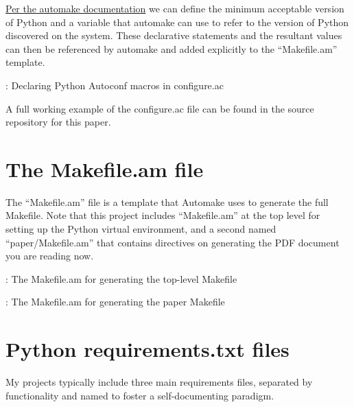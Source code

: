 \justifying
\href{https://www.gnu.org/software/automake/manual/html\_node/Python.html}{Per the automake documentation} we can define the minimum acceptable version of Python
and a variable that automake can use to refer to the version of Python discovered on the system. These declarative statements and the resultant values can then be
referenced by automake and added explicitly to the ``Makefile.am'' template.

\begin{mybox}{\thetcbcounter: Declaring Python Autoconf macros in configure.ac}
    
\end{mybox}
\vspace{2mm}

\justifying
A full working example of the configure.ac file can be found in the source repository for this paper.

\section{\label{sec:make}The Makefile.am file}

\justifying
The ``Makefile.am'' file is a template that Automake uses to generate the full Makefile. Note that this project includes
``Makefile.am'' at the top level for setting up the Python virtual environment, and a second named ``paper/Makefile.am''
that contains directives on generating the PDF document you are reading now.

\begin{mybox}{\thetcbcounter: The Makefile.am for generating the top-level Makefile}
    
\end{mybox}
\vspace{2mm}

\begin{mybox}{\thetcbcounter: The Makefile.am for generating the paper Makefile}
    
\end{mybox}
\vspace{2mm}

\section{\label{sec:make}Python requirements.txt files}

\justifying
My projects typically include three main requirements files, separated by functionality and named to foster a self-documenting paradigm.

